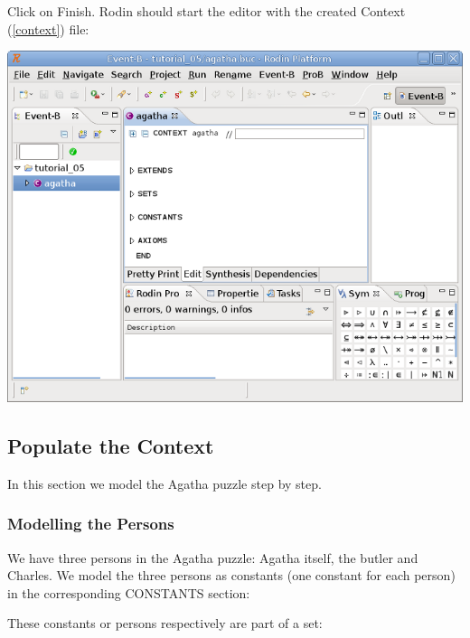 Click on \textsf{Finish}. Rodin should start the editor with the created Context (\ref{context}) file:

\begin{center}
	\includegraphics{img/tutorial/tut_05_agatha2.png}
\end{center}

\subsection{Populate the Context}

In this section we model the Agatha puzzle step by step.

\subsubsection{Modelling the Persons}

We have three persons in the Agatha puzzle: Agatha itself, the butler and Charles. We model the three persons as constants (one constant for each person) in the corresponding \textsf{CONSTANTS} section:


These constants or persons respectively are part of a set:


